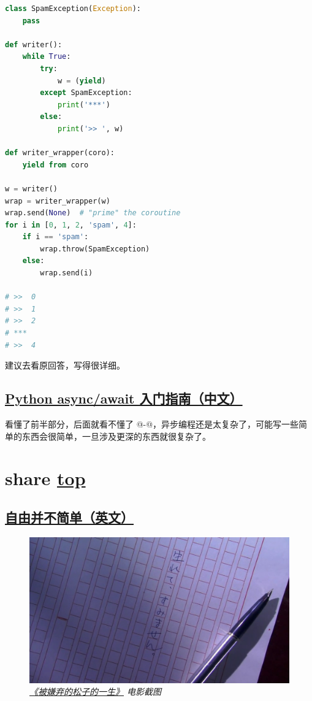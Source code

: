 \begin{lstlisting}[language=Python]
class SpamException(Exception):
    pass

def writer():
    while True:
        try:
            w = (yield)
        except SpamException:
            print('***')
        else:
            print('>> ', w)

def writer_wrapper(coro):
    yield from coro

w = writer()
wrap = writer_wrapper(w)
wrap.send(None)  # "prime" the coroutine
for i in [0, 1, 2, 'spam', 4]:
    if i == 'spam':
        wrap.throw(SpamException)
    else:
        wrap.send(i)

# >>  0
# >>  1
# >>  2
# ***
# >>  4
\end{lstlisting}

建议去看原回答，写得很详细。

\subsection{\href{https://zhuanlan.zhihu.com/p/27258289}{Python async/await 入门指南（中文）}}

看懂了前半部分，后面就看不懂了 @-@，异步编程还是太复杂了，可能写一些简单的东西会很简单，一旦涉及更深的东西就很复杂了。

\section{share \hyperref[chap:w3]{top}}\label{w3:share}

\subsection{\href{https://www.arp242.net/freedom.html}{自由并不简单（英文）}}

\begin{figure}[htbp]
  \centering
    \includegraphics[width=\textwidth]{../images/2020/11/嫌われ松子の一生.jpg}
  \caption{\textit{\href{https://movie.douban.com/subject/1787291/}{《被嫌弃的松子的一生》} 电影截图}}
\end{figure}

